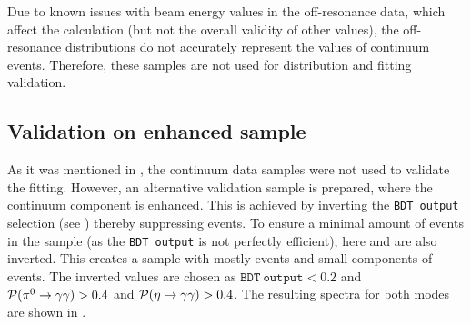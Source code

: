 Due to known issues with beam energy values in the off-resonance data, which affect the \Mbc calculation (but not the overall validity of other values), 
the \epem\ra\qqbar off-resonance \Mbc distributions do not accurately represent the \Mbc values of continuum events.
Therefore, these samples are not used for \Mbc distribution and \Mbc fitting validation.

\subsection{Validation on \texorpdfstring{\epem\ra\qqbar}{e+e- -> qqbar} enhanced sample}\label{sec:continuum_mbc_validation}

As it was mentioned in ,
the continuum data samples were not used to validate the \Mbc fitting.
However, an alternative validation sample is prepared, where the continuum component is enhanced.
This is achieved by inverting the \texttt{BDT~output} selection (see ) thereby suppressing \BB events.
To ensure a minimal amount of \BtoXsgamma events in the sample (as the \texttt{BDT~output} is not perfectly efficient), here \piVeto and \etaVeto
are also inverted.
This creates a sample with mostly \epem\ra\qqbar events and small components of \BB events.
The inverted values are chosen as $\mathtt{BDT~output}<0.2$ and ${\mathcal{P}(\pi^0\rightarrow\gamma\gamma)}>0.4$ and ${\mathcal{P}(\eta\rightarrow\gamma\gamma)}>0.4$.
The resulting \EB spectra for both \FEI modes are shown in .
